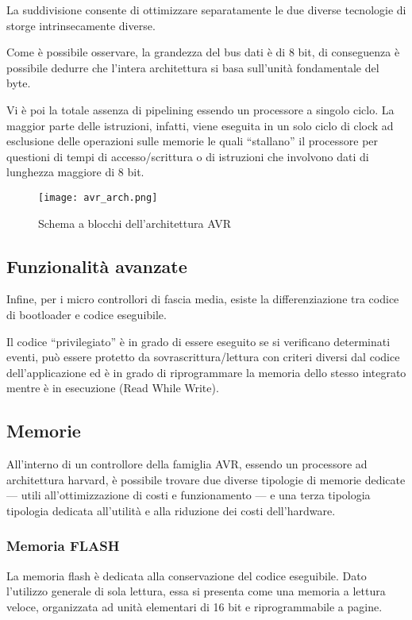 La suddivisione consente di ottimizzare separatamente le due diverse tecnologie di storge intrinsecamente diverse.

Come è possibile osservare, la grandezza del bus dati è di 8 bit, di conseguenza è possibile dedurre che l'intera architettura si basa sull'unità fondamentale del byte.

Vi è poi la totale assenza di pipelining essendo un processore a singolo ciclo. La maggior parte delle istruzioni, infatti, viene eseguita in un solo ciclo di clock\cite{avr:m328p} ad esclusione delle operazioni sulle memorie le quali ``stallano'' il processore per questioni di tempi di accesso/scrittura o di istruzioni che involvono dati di lunghezza maggiore di 8 bit.

\begin{figure}[t]
    \centering
    \texttt{[image: avr\_arch.png]}
    \caption[Immagine ottenuta dal documento~\cite{avr:m328p}, fig. 7-1]{Schema a blocchi dell'architettura AVR\cite{avr:m328p}}\label{fig:avr-arch}
\end{figure}

\subsection{Funzionalità avanzate}\label{ss:advanced-features}

Infine, per i micro controllori di fascia media, esiste la differenziazione tra codice di bootloader e codice eseguibile.

Il codice ``privilegiato'' è in grado di essere eseguito se si verificano determinati eventi, può essere protetto da sovrascrittura/lettura con criteri diversi dal codice dell'applicazione ed è in grado di riprogrammare la memoria dello stesso integrato mentre è in esecuzione (Read While Write)\cite{avr:m328p}.

\subsection{Memorie}

All'interno di un controllore della famiglia AVR, essendo un processore ad architettura harvard, è possibile trovare due diverse tipologie di memorie dedicate --- utili all'ottimizzazione di costi e funzionamento --- e una terza tipologia tipologia dedicata all'utilità e alla riduzione dei costi dell'hardware.

\subsubsection{Memoria FLASH}
La memoria flash è dedicata alla conservazione del codice eseguibile.
Dato l'utilizzo generale di sola lettura, essa si presenta come una memoria a lettura veloce, organizzata ad unità elementari di 16 bit e riprogrammabile a pagine.

